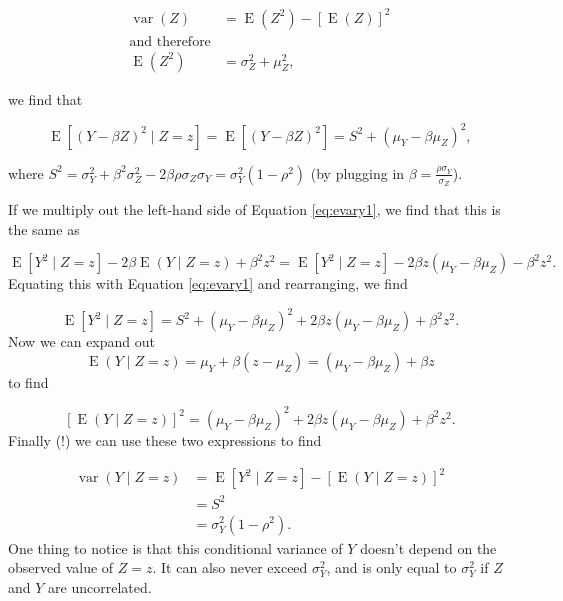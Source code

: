 \documentclass[
  openany]{book}
\theoremstyle{definition}
\theoremstyle{definition}
\theoremstyle{definition}
\theoremstyle{definition}
\theoremstyle{remark}
\begin{document}
\[
\begin{aligned}
\operatorname{var}\left(Z\right) & = \operatorname{E}\left(Z^2\right) - \left[\operatorname{E}\left(Z\right)\right]^2\\
\text{and therefore} & \\
\operatorname{E}\left(Z^2\right)  &= \sigma_Z^2 + \mu_Z^2,
\end{aligned}
\]

we find that

\begin{equation}
\operatorname{E}\left[\left(Y-\beta Z\right)^2 \mid Z=z\right] = \operatorname{E}\left[\left(Y-\beta Z\right)^2\right] =S^2 + \left(\mu_Y - \beta \mu_Z\right)^2,
\label{eq:evary1}
\end{equation}

where \(S^2 = \sigma^2_Y + \beta^2\sigma^2_Z - 2\beta\rho\sigma_Z\sigma_Y = \sigma^2_Y\left(1-\rho^2\right)\) (by plugging in \(\beta = \frac{\rho\sigma_Y}{\sigma_Z}\)).

If we multiply out the left-hand side of Equation \eqref{eq:evary1}, we find that this is the same as

\[\operatorname{E}\left[Y^2\mid{Z=z}\right] - 2\beta\operatorname{E}\left(Y\mid{Z=z}\right) + \beta^2 z^2 = \operatorname{E}\left[Y^2\mid{Z=z}\right] - 2\beta z\left(\mu_Y - \beta\mu_Z\right) - \beta^2 z^2.\]
Equating this with Equation \eqref{eq:evary1} and rearranging, we find

\[\operatorname{E}\left[Y^2\mid{Z=z}\right] = S^2 + \left(\mu_Y - \beta\mu_Z\right)^2 + 2\beta z\left(\mu_Y - \beta \mu_Z\right) + \beta^2z^2.\]
Now we can expand out
\[\operatorname{E}\left(Y\mid{Z=z}\right) = \mu_Y + \beta\left(z-\mu_Z\right) = \left(\mu_Y - \beta\mu_Z\right) +\beta z\]
to find

\[\left[\operatorname{E}\left(Y\mid{Z=z}\right) \right]^2  = \left(\mu_Y - \beta\mu_Z\right)^2 + 2\beta z \left(\mu_Y - \beta\mu_Z\right) + \beta^2 z^2.\]
Finally (!) we can use these two expressions to find

\[
\begin{aligned}
\operatorname{var}\left(Y\mid{Z=z}\right) & = \operatorname{E}\left[Y^2\mid{Z=z}\right] - \left[\operatorname{E}\left(Y\mid{Z=z}\right)\right]^2\\
& = S^2 \\
& = \sigma_Y^2\left(1-\rho^2\right).
\end{aligned}
\]
One thing to notice is that this conditional variance of \(Y\) doesn't depend on the observed value of \(Z=z\). It can also never exceed \(\sigma^2_Y\), and is only equal to \(\sigma^2_Y\) if \(Z\) and \(Y\) are uncorrelated.
\end{document}

